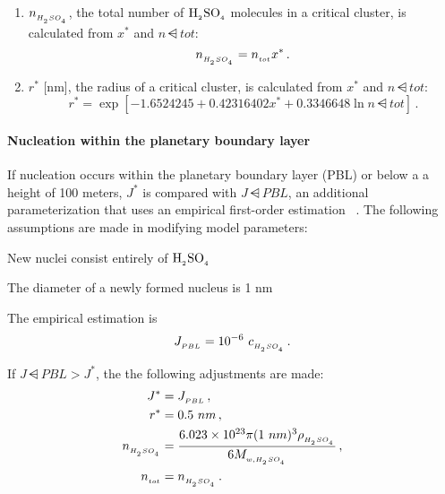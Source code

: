 \begin{enumerate}
        .
  \item $n_{_{H_{_2}SO_{_4}}}$, the total number of $\rm H_{_2}SO_{_4}$ molecules in a critical
        cluster, is calculated from $x^*$ and $n\dsub{tot}$:
        \begin{equation}
          n_{_{H_{_2}SO_{_4}}} = n_{_{tot}} x^* \,.
        \end{equation}
  \item $r^*$ [nm], the radius of a critical cluster, is calculated from
        $x^*$ and $n\dsub{tot}$:
        \begin{equation}
          r^* = \exp \left[ -1.6524245 + 0.42316402 x^* +
                0.3346648 \ln n\dsub{tot} \right] \,.
        \end{equation}
\end{enumerate}

\paragraph{Nucleation within the planetary boundary layer} 

If nucleation occurs within the planetary boundary layer (PBL) or below a
a height of 100 meters, $J^*$ is compared with $J\dsub{PBL}$, an additional
parameterization that uses an empirical first-order estimation
~\cite{sihto-2006-acp,wang-2009-acp}. The following assumptions are made in
modifying model parameters:

\begin{assume}
  New nuclei consist entirely of $\rm H_{_2}SO_{_4}$
\end{assume}

\begin{assume}
  The diameter of a newly formed nucleus is 1 nm
\end{assume}

The empirical estimation is
\begin{equation}
  J_{_{PBL}} = 10^{-6}~c_{_{H_{_2}SO_{_4}}} \,.
\end{equation}

If $J\dsub{PBL} > J^*$, the the following adjustments are made:
\begin{align}
  J^* &= J_{_{PBL}} \,, \\
  r^* &= 0.5~nm \,, \\
  n_{_{H_{_2}SO_{_4}}} &= \frac{6.023 \times 10^{23} \pi (1~nm)^3
                  \rho_{_{H_{_2}SO_{_4}}}}{6 M_{_{w,H_{_2}SO_{_4}}}} \,, \\
  n_{_{tot}} &= n_{_{H_{_2}SO_{_4}}} \,.
\end{align}


